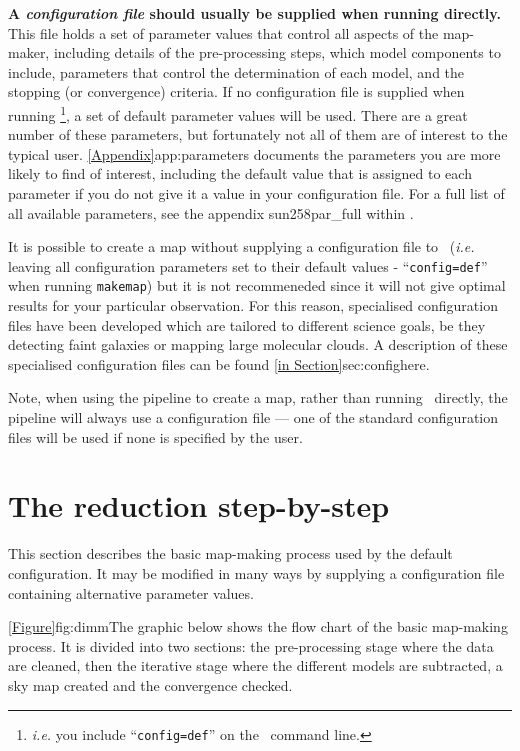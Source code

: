 \textbf{A \emph{configuration file} should usually be supplied when
running \makemap directly.} This file holds a set of parameter values
that control all aspects of the map-maker, including details of the
pre-processing steps, which model components to include, parameters that
control the determination of each model, and the stopping (or
convergence) criteria. If no configuration file is supplied when running
\makemap\footnote{\emph{i.e.} you include ``\texttt{config=def}'' on the
\makemap\ command line.}, a set of default parameter values will be used.
There are a great number of these parameters, but fortunately not all of
them are of interest to the typical user. \cref{Appendix}{app:parameters}{}
documents the parameters you are more likely to find of interest,
including the default value that is assigned to each parameter if you do
not give it a value in your configuration file.  For a full list of all
available parameters, see the appendix 
{sun258}{par_full} within .

It is possible to create a map without supplying a configuration file to
\makemap\ (\emph{i.e.} leaving all configuration parameters set to their default
values - ``\texttt{config=def}'' when running \texttt{makemap}) but it is not
recommeneded since it will not give optimal results
for your particular observation. For this reason, specialised
configuration files have been developed which are tailored to different
science goals, be they detecting faint galaxies or mapping large
molecular clouds. A description of these specialised configuration files
can be found \cref{in Section}{sec:config}{here}.

Note, when using the pipeline to create a map, rather than running
\makemap\ directly, the pipeline will always use a configuration file ---
one of the standard configuration files will be used if none is specified
by the user.

\section{The reduction step-by-step}
\label{sec:algorithm}

This section describes the basic map-making process used by the
default configuration.  It may be modified in many ways by supplying a
configuration file containing alternative parameter values.

\cref{Figure}{fig:dimm}{The graphic below} shows the flow chart of the
basic map-making process. It is divided into two sections: the pre-processing
stage where the data are cleaned, then the iterative stage where the different
models are subtracted, a sky map created and the convergence checked.


